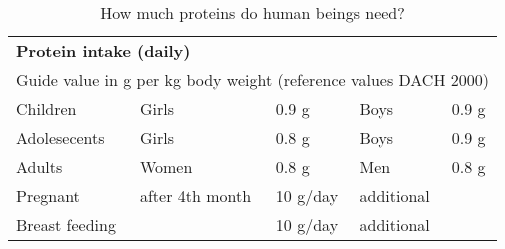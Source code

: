 \documentclass[../main.tex]{subfiles}
\begin{document}
  \begin{table}[htb!]
    \centering
    \begin{tabular}{lllll}
      \multicolumn{5}{l}{\textbf{Protein intake (daily)}} \\
      \multicolumn{5}{l}{Guide value in g per kg body weight (reference values DACH 2000)}\\
      \hline
      Children & Girls & 0.9 g & Boys & 0.9 g \\
      Adolesecents & Girls & 0.8 g & Boys & 0.9 g \\
      Adults & Women & 0.8 g & Men & 0.8 g \\
      Pregnant & after 4th month & 10 g/day & additional \\
      Breast feeding &  & 10 g/day & additional \\ 
    \end{tabular}
    \caption{How much proteins do human beings need?}
  \end{table}
  
\end{document}
